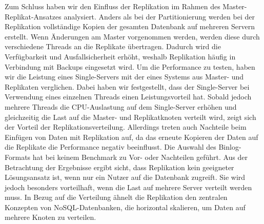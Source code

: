 Zum Schluss haben wir den Einfluss der Replikation im Rahmen des Master-Replikat-Ansatzes analysiert.
Anders als bei der Partitionierung werden bei der Replikation vollständige Kopien der gesamten Datenbank auf mehreren Servern erstellt.
Wenn Änderungen am Master vorgenommen werden, werden diese durch verschiedene Threads an die Replikate übertragen.
Dadurch wird die Verfügbarkeit und Ausfallsicherheit erhöht, weshalb Replikation häufig in Verbindung mit Backups eingesetzt wird.
Um die Performance zu testen, haben wir die Leistung eines Single-Servers mit der eines Systems aus Master- und Replikaten verglichen.
Dabei haben wir festgestellt, dass der Single-Server bei Verwendung eines einzelnen Threads einen Leistungsvorteil hat.
Sobald jedoch mehrere Threads die CPU-Auslastung auf dem Single-Server erhöhen und gleichzeitig die Last auf die Master- und Replikatknoten verteilt wird, zeigt sich der Vorteil der Replikationsverteilung.
Allerdings treten auch Nachteile beim Einfügen von Daten mit Replikation auf, da das erneute Kopieren der Daten auf die Replikate die Performance negativ beeinflusst.
Die Auswahl des Binlog-Formats hat bei keinem Benchmark zu Vor- oder Nachteilen geführt.
Aus der Betrachtung der Ergebnisse ergibt sicht, dass Replikation kein geeigneter Lösungsansatz ist, wenn nur ein Nutzer auf die Datenbank zugreift.
Sie wird jedoch besonders vorteilhaft, wenn die Last auf mehrere Server verteilt werden muss.
In Bezug auf die Verteilung ähnelt die Replikation den zentralen Konzepten von NoSQL-Datenbanken, die horizontal skalieren, um Daten auf mehrere Knoten zu verteilen.